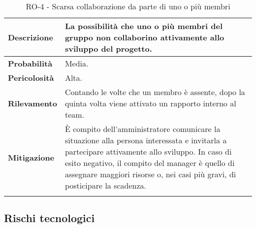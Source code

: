 \begin{longtable}{ | l | p{12cm} | }
	\hline
	\textbf{Descrizione}  & La possibilità che uno o più membri del gruppo non collaborino attivamente allo sviluppo del progetto.                                                                                                                                                                           \\
	\hline
	\textbf{Probabilità}  & Media.                                                                                                                                                                                                                                                                           \\
	\hline
	\textbf{Pericolosità} & Alta.                                                                                                                                                                                                                                                                            \\
	\hline
	\textbf{Rilevamento}  & Contando le volte che un membro è assente, dopo la quinta volta viene attivato un rapporto interno al team.                                                                                                                                                                      \\
	\hline
	\textbf{Mitigazione}  & È compito dell'amministratore comunicare la situazione alla persona interessata e invitarla a partecipare attivamente allo sviluppo. In caso di esito negativo, il compito del manager è quello di assegnare maggiori risorse o, nei casi più gravi, di posticipare la scadenza. \\
	\hline
	\caption{RO-4 - Scarsa collaborazione da parte di uno o più membri}
	\label{table:4}
\end{longtable}



\subsection{Rischi tecnologici}


